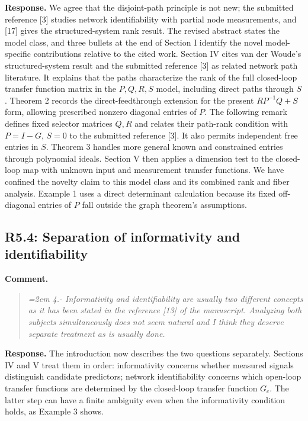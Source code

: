 \documentclass[11pt]{article}
\begin{document}
\textbf{Response.} We agree that the disjoint-path principle is not new;
the submitted reference [3] studies network identifiability with partial
node measurements, and [17] gives the structured-system rank result.
The revised abstract states the model class, and three bullets at the end of
Section I identify the novel model-specific contributions relative to the
cited work. Section IV cites van der Woude's structured-system result and
the submitted reference [3] as related network path literature. It explains
that the paths characterize the rank of the full closed-loop transfer function
matrix in the $P,Q,R,S$ model, including direct paths through $S$.
Theorem 2 records the direct-feedthrough extension for the present
$RP^{-1}Q+S$ form, allowing prescribed nonzero diagonal entries of $P$.
The following remark defines fixed selector matrices $Q,R$ and relates
their path-rank condition with $P=I-G$, $S=0$ to the submitted reference [3].
It also permits independent free entries in $S$. Theorem 3 handles more
general known and constrained entries through polynomial ideals. Section V then
applies a dimension test to the closed-loop map with unknown input and
measurement transfer functions. We have confined the novelty claim to this model
class and its combined rank and fiber analysis.
Example 1 uses a direct determinant calculation because its fixed
off-diagonal entries of $P$ fall outside the graph theorem's assumptions.

\subsection*{R5.4: Separation of informativity and identifiability}
\textbf{Comment.}
\begin{quote}\itshape\emergencystretch=2em
4.- Informativity and identifiability are usually two different concepts as it has been stated in the reference [13] of the manuscript. Analyzing both subjects simultaneously does not seem natural and I think they deserve separate treatment as is usually done.
\end{quote}

\textbf{Response.} The introduction now describes the two questions
separately. Sections IV and V treat them in order: informativity concerns
whether measured signals distinguish candidate predictors; network
identifiability concerns which open-loop transfer functions are determined
by the closed-loop transfer function $G_c$. The latter step can have a finite ambiguity
even when the informativity condition holds, as Example 3 shows.
\end{document}
